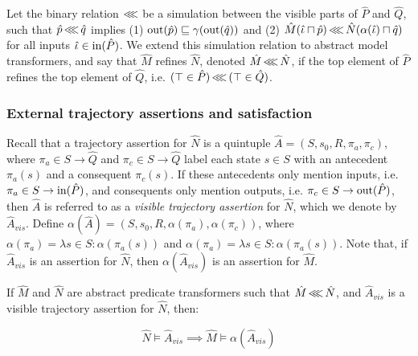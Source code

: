 Let the binary relation $\operatorname{\lll}$ be a simulation between the visible parts of $\hat P$ and $\hat Q$, such that $\hat p \operatorname{\lll} \hat q$ implies (1) $\operatorname{out}(\hat p) \sqsubseteq \gamma(\operatorname{out}(\hat q))$ and (2) $\hat M(\hat \iota \sqcap \hat p) \operatorname{\lll} \hat N(\alpha(\hat \iota) \sqcap \hat q)$ for all inputs $\hat \iota \in \operatorname{in}(\hat P)$. We extend this simulation relation to abstract model transformers, and say that $\hat M$ refines $\hat N$, denoted $\hat M \operatorname{\lll} \hat N$, if the top element of $\hat P$ refines the top element of $\hat Q$, i.e. $(\top \in \hat P) \operatorname{\lll} \, (\top \in \hat Q)$.


\subsubsection{External trajectory assertions and satisfaction}

Recall that a trajectory assertion for $\hat N$ is a quintuple $\hat A = (S, s_{0}, R, \pi_{a}, \pi_{c})$, where $\pi_{a} \in S \rightarrow \hat Q$ and $\pi_{c} \in S \rightarrow \hat Q$ label each state $s \in S$ with an antecedent $\pi_{a}(s)$ and a consequent $\pi_{c}(s)$. If these antecedents only mention inputs, i.e. $\pi_{a} \in S \rightarrow \operatorname{in}(\hat P)$, and consequents only mention outputs, i.e. $\pi_{c} \in S \rightarrow \operatorname{out}(\hat P)$, then $\hat A$ is referred to as a \textit{visible trajectory assertion} for $\hat N$, which we denote by $\hat A_{vis}$. Define $\alpha(\hat A) = (S, s_{0}, R, \alpha(\pi_{a}), \alpha(\pi_{c}))$, where $\alpha(\pi_{a}) = \lambda s \in S : \alpha(\pi_{a}(s))$ and $\alpha(\pi_{a}) = \lambda s \in S : \alpha(\pi_{a}(s))$. Note that, if $\hat A_{vis}$ is an assertion for $\hat N$, then $\alpha(\hat A_{vis})$ is an assertion for $\hat M$.



\begin{theorem}
\label{thm:refinement}
If $\hat M$ and $\hat N$ are abstract predicate transformers such that $\hat M \operatorname{\lll} \hat N$, and $\hat A_{vis}$ is a visible trajectory assertion for $\hat N$, then:

\begin{equation*}
\hat N \models \hat A_{vis} \implies \hat M \models \alpha(\hat A_{vis})
\end{equation*}
\end{theorem}

